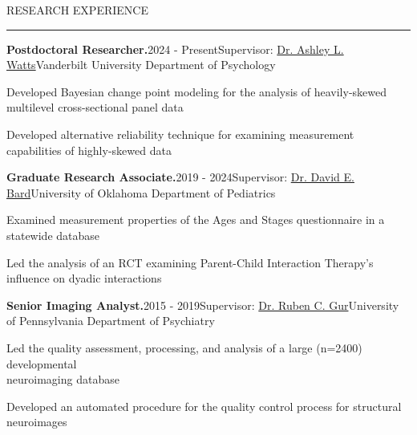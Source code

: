 \documentclass{resume} %
\renewenvironment{rSection}[1]{
\sectionskip
\textcolor{CarnegieMellonRed}{\MakeUppercase{#1}}
\sectionlineskip
\hrule
\begin{list}{}{
\setlength{\leftmargin}{1.5em}
}
\item[]
}{
\end{list}
}
\begin{document}
\begin{rSection}{Research Experience}
\begin{rSubsection}{\textbf{Postdoctoral Researcher.}}{2024 - Present}{Supervisor: \href{https://www.vanderbilt.edu/psychological_sciences/bio/ashley-watts}{Dr. Ashley L. Watts}}{Vanderbilt University Department of Psychology}
\item Developed Bayesian change point modeling for the analysis of heavily-skewed multilevel cross-sectional panel data
\item Developed alternative reliability technique for examining measurement capabilities of highly-skewed data
\end{rSubsection}


\begin{rSubsection}{\textbf{Graduate Research Associate.}}{2019 - 2024}{Supervisor: \href{https://research.ouhsc.edu/about/administration/details/david-bard-phd}{Dr. David E. Bard}}{University of Oklahoma Department of Pediatrics}
\item Examined measurement properties of the Ages and Stages questionnaire in a statewide database
\item Led the analysis of an RCT examining Parent-Child Interaction Therapy's influence on dyadic interactions  
\end{rSubsection}

\begin{rSubsection}{\textbf{Senior Imaging Analyst.}}{2015 - 2019}{Supervisor: \href{https://www.med.upenn.edu/bbl/faculty-rcgur.html}{Dr. Ruben C. Gur}}{University of Pennsylvania Department of Psychiatry}
\item Led the quality assessment, processing, and analysis of a large (n=2400) developmental\\ neuroimaging database
\item Developed an automated procedure for the quality control process for structural neuroimages 
\end{rSubsection}
    
\end{rSection}
\end{document}
